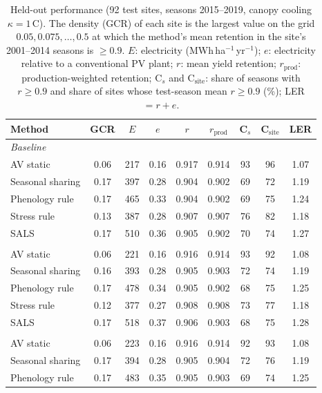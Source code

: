 \begin{table}[t]
\centering
\caption{Held-out performance (92 test sites, seasons 2015--2019, canopy cooling $\kappa=1$\,\textdegree C). The density (GCR) of each site is the largest value on the grid $0.05,0.075,\dots,0.5$ at which the method's mean retention in the site's 2001--2014 seasons is $\ge0.9$. $E$: electricity (MWh\,ha$^{-1}$\,yr$^{-1}$); $e$: electricity relative to a conventional PV plant; $r$: mean yield retention; $r_{\mathrm{prod}}$: production-weighted retention; C$_s$ and C$_{\mathrm{site}}$: share of seasons with $r\ge0.9$ and share of sites whose test-season mean $r\ge0.9$ (\%); LER $=r+e$.}
\label{tab:main}
\small
\setlength{\tabcolsep}{4pt}
\begin{tabular}{lcccccccc}
\toprule
Method & GCR & $E$ & $e$ & $r$ & $r_{\mathrm{prod}}$ & C$_s$ & C$_{\mathrm{site}}$ & LER\\
\midrule
\multicolumn{9}{l}{\textit{Baseline}}\\
AV static & 0.06 & 217 & 0.16 & 0.917 & 0.914 & 93 & 96 & 1.07\\
Seasonal sharing & 0.17 & 397 & 0.28 & 0.904 & 0.902 & 69 & 72 & 1.19\\
Phenology rule & 0.17 & 465 & 0.33 & 0.904 & 0.902 & 69 & 75 & 1.24\\
Stress rule & 0.13 & 387 & 0.28 & 0.907 & 0.907 & 76 & 82 & 1.18\\
SALS & 0.17 & 510 & 0.36 & 0.905 & 0.902 & 70 & 74 & 1.27\\
\addlinespace
\multicolumn{9}{l}{\textit{+1.5\,\textdegree C}}\\
AV static & 0.06 & 221 & 0.16 & 0.916 & 0.914 & 93 & 92 & 1.08\\
Seasonal sharing & 0.16 & 393 & 0.28 & 0.905 & 0.903 & 72 & 74 & 1.19\\
Phenology rule & 0.17 & 478 & 0.34 & 0.905 & 0.902 & 68 & 75 & 1.25\\
Stress rule & 0.12 & 377 & 0.27 & 0.908 & 0.908 & 73 & 77 & 1.18\\
SALS & 0.17 & 518 & 0.37 & 0.906 & 0.903 & 68 & 75 & 1.28\\
\addlinespace
\multicolumn{9}{l}{\textit{+2\,\textdegree C}}\\
AV static & 0.06 & 223 & 0.16 & 0.916 & 0.914 & 92 & 93 & 1.08\\
Seasonal sharing & 0.17 & 394 & 0.28 & 0.905 & 0.904 & 72 & 76 & 1.19\\
Phenology rule & 0.17 & 483 & 0.35 & 0.905 & 0.903 & 69 & 74 & 1.25\\

\end{tabular}
\end{table}
